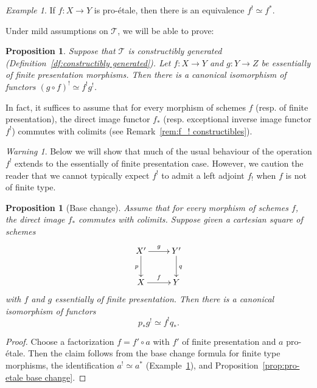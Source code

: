 \documentclass[11pt]{article}
\newcommand{\resp}{resp.\xspace}
\numberwithin{equation}{section}\renewcommand{\encodingdefault}{TU}
\newcommand{\T}{\mathscr T}
\newtheorem{prop}[thm]{Proposition}
\theoremstyle{remark}
\newtheorem{ex}[thm]{Example}
\newtheorem{warn}[thm]{Warning}
\theoremstyle{definition}
\numberwithin{equation}{thm}
\begin{document}
\begin{ex}\label{ex:f^! pro-etale}
If $f : X \to Y$ is pro-étale, then there is an equivalence $f^! \simeq f^*$.
\end{ex}

Under mild assumptions on $\T$, we will be able to prove:

\begin{prop}\label{prop:f^! efp compose}
Suppose that $\T$ is constructibly generated (Definition~\ref{df:constructibly generated}).
Let $f : X \to Y$ and $g : Y \to Z$ be essentially of finite presentation morphisms.
Then there is a canonical isomorphism of functors $(g\circ f)^! \simeq f^!g^!$.
\end{prop}

In fact, it suffices to assume that for every morphism of schemes $f$ (\resp of finite presentation), the direct image functor $f_*$ (\resp exceptional inverse image functor $f^!$) commutes with colimits (see Remark~\ref{rem:f_! constructibles}).

\begin{warn}\label{warn:f_! efp}
Below we will show that much of the usual behaviour of the operation $f^!$ extends to the essentially of finite presentation case.
However, we caution the reader that we cannot typically expect $f^!$ to admit a left adjoint $f_!$ when $f$ is not of finite type.
\end{warn}

\begin{prop}[Base change]\label{prop:base change efp}
Assume that for every morphism of schemes $f$, the direct image $f_*$ commutes with colimits.
Suppose given a cartesian square of schemes
\[
\xymatrix{
X' \ar[r]^-{g}\ar[d]_{p}
& Y' \ar[d]^{q}
\\
X \ar[r]^-{f}
& Y
}
\]
with $f$ and $g$ essentially of finite presentation.
Then there is a canonical isomorphism of functors
\[
p_*g^! \simeq f^!q_*.
\]
\end{prop}
\begin{proof}
Choose a factorization $f = f' \circ a$ with $f'$ of finite presentation and $a$ pro-étale.
Then the claim follows from the base change formula for finite type morphisms, the identification $a^! \simeq a^*$ (Example~\ref{ex:f^! pro-etale}), and Proposition~\ref{prop:pro-etale base change}.
\end{proof}
\end{document}
